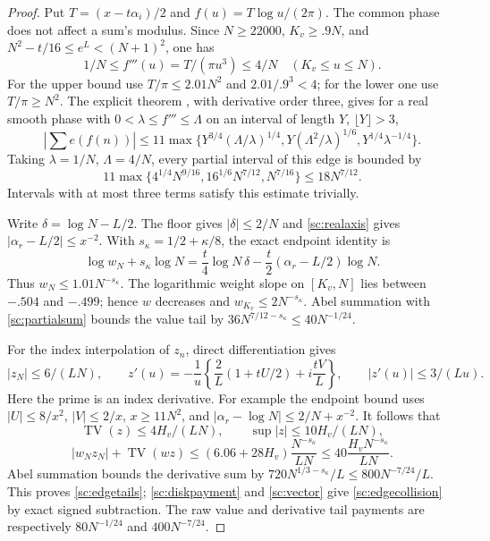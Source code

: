 \documentclass[11pt]{article}
\numberwithin{equation}{section}
\theoremstyle{definition}
\theoremstyle{remark}
\begin{document}
\begin{proof}
Put $T=(x-t\alpha_i)/2$ and $f(u)=T\log u/(2\pi)$.
The common phase does not affect a sum's modulus. Since
$N\ge22000$, $K_v\ge.9N$, and
$N^2-t/16\le e^L<(N+1)^2$, one has
\[
 1/N\le f'''(u)=T/(\pi u^3)\le4/N\quad(K_v\le u\le N).
\]
For the upper bound use $T/\pi\le2.01N^2$ and $2.01/.9^3<4$;
for the lower one use $T/\pi\ge N^2$.
The explicit theorem \cite[equation~(2)]{arias}, with derivative order
three, gives for a real smooth phase with $0<\lambda\le f'''\le\Lambda$
on an interval of length $Y$, $\lfloor Y\rfloor>3$,
\[
 \left|\sum e(f(n))\right|
 \le11\max\{Y^{3/4}(\Lambda/\lambda)^{1/4},
             Y(\Lambda^2/\lambda)^{1/6},Y^{1/4}\lambda^{-1/4}\}.
\]
Taking $\lambda=1/N$, $\Lambda=4/N$, every partial interval of this
edge is bounded by
\begin{equation}\label{sc:partialsum}
 11\max\{4^{1/4}N^{9/16},16^{1/6}N^{7/12},N^{7/16}\}
 \le18N^{7/12}.
\end{equation}
Intervals with at most three terms satisfy this estimate trivially.

Write $\delta=\log N-L/2$. The floor gives $|\delta|\le2/N$ and
\eqref{sc:realaxis} gives $|\alpha_r-L/2|\le x^{-2}$.
With $s_\kappa=1/2+\kappa/8$, the exact endpoint identity is
\[
 \log w_N+s_\kappa\log N
 =\frac t4\log N\,\delta-\frac t2(\alpha_r-L/2)\log N.
\]
Thus $w_N\le1.01N^{-s_\kappa}$. The logarithmic weight slope on
$[K_v,N]$ lies between $-.504$ and $-.499$; hence $w$ decreases and
$w_{K_v}\le2N^{-s_\kappa}$. Abel summation with
\eqref{sc:partialsum} bounds the value tail by
$36N^{7/12-s_\kappa}\le40N^{-1/24}$.

For the index interpolation of $z_n$, direct differentiation gives
\[
 |z_N|\le6/(LN),\qquad
 z'(u)=-\frac1u\left\{\frac2L(1+tU/2)+i\frac{tV}L\right\},
 \qquad |z'(u)|\le3/(Lu).
\]
Here the prime is an index derivative. For example the endpoint bound
uses $|U|\le8/x^2$, $|V|\le2/x$, $x\ge11N^2$, and
$|\alpha_r-\log N|\le2/N+x^{-2}$.
It follows that
\[
 \operatorname{TV}(z)\le4H_v/(LN),\qquad
 \sup|z|\le10H_v/(LN),
\]
\[
 |w_Nz_N|+\operatorname{TV}(wz)
 \le(6.06+28H_v)\frac{N^{-s_\kappa}}{LN}
 \le40\frac{H_vN^{-s_\kappa}}{LN}.
\]
Abel summation bounds the derivative sum by
$720N^{1/3-s_\kappa}/L\le800N^{-7/24}/L$.
This proves \eqref{sc:edgetails}; \eqref{sc:diskpayment} and
\eqref{sc:vector} give \eqref{sc:edgecollision} by exact signed
subtraction. The raw value and derivative tail payments are respectively
$80N^{-1/24}$ and $400N^{-7/24}$.
\end{proof}
\end{document}

